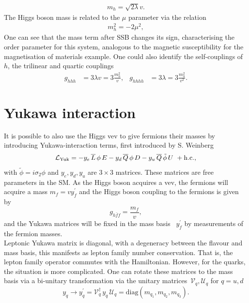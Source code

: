 \begin{align}
	m_h =\sqrt{2 \lambda} v .
\end{align}
The  Higgs boson mass is related to the $\mu$ parameter via the relation
\begin{align}
	m_h ^2 =-2 \mu^2,
\end{align}
One can see that the mass term after SSB changes its sign, characterising the order parameter for this system,  analogous to the magnetic susceptibility for the magnetisation of materials example. 
One could also identify the self-couplings of~$h$, the trilinear and quartic couplings 
\begin{align}
	g_{hhh}&=3\lambda v =3\frac{m_h^2}{v}, & g_{hhhh}&= 3 \lambda = 3\frac{m_h^2}{v^2}.
\end{align}
\section{Yukawa interaction \label{smyukawa}}
It is possible to also use the Higgs vev to give fermions their masses by introducing  Yukawa-interaction terms, first introduced by S. Weinberg~\cite{PhysRevLett.19.1264}
\begin{equation}
	\mathcal{L}_{\mathrm{Yuk}}= -y_{e} \, \overline{L} \, \phi \, E 
	- y_{d} \, \overline{Q} \, \phi \, D
	- y_u \, \overline{Q} \, \tilde{\phi} \, U   \ + \mathrm{h.c.},
	\label{lag-yuk}
\end{equation}
with $ \tilde{\phi}= i\sigma_2 \phi$ and $ y_e, y_d, y_u$ are $3\times 3$ matrices. These matrices are free parameters in the SM. As the Higgs boson acquires a vev, the fermions will acquire a mass $m_f= vy^\prime_f$ and the Higgs boson coupling to the fermions is given by
\begin{equation}
	g_{h\bar{f}f} = \frac{m_f}{v},
\end{equation}
and the Yukawa matrices will be fixed in the mass basis ~$y^\prime_f$ by measurements of the fermion masses.\\  Leptonic Yukawa matrix is diagonal, with a degeneracy between the flavour and mass basis, this manifests as lepton family number conservation. That is, the lepton family operator commutes with the Hamiltonian. However, for the quarks, the situation is more complicated. One can rotate these matrices to the mass basis via a bi-unitary transformation via the unitary matrices~$ \mathcal{V}_q, \mathcal{U}_q$ for $ q= u,d$
\begin{equation}
	y_{q} \longrightarrow y^\prime_q= \mathcal{V}^\dagger_{q} \,y_q\, \mathcal{U}_{q} = \text{diag}\left(m_{q_1}, m_{q_2},m_{q_3}\right).
\end{equation}
